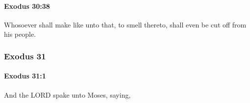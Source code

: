 		\paragraph{Exodus 30:38} %
			\label{EXODUS-30-38}

			Whosoever shall make like unto that, to smell thereto, shall even be cut off from his people.

	\subsubsection{Exodus 31} %
		\label{EXODUS-31}

		\paragraph{Exodus 31:1} %
			\label{EXODUS-31-1}

			And the LORD spake unto Moses, saying,


